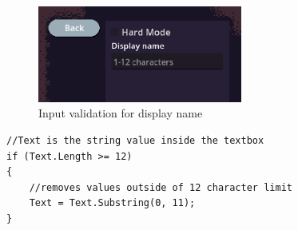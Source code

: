 \documentclass{article}
\begin{document}
\begin{figure}[H]
\centering 
\includegraphics[width=0.6\textwidth]{input validation}
\caption{Input validation for display name}
\label{input_validation}
\end{figure}

\begin{lstlisting}
//Text is the string value inside the textbox
if (Text.Length >= 12)
{
	//removes values outside of 12 character limit
	Text = Text.Substring(0, 11);
}
\end{lstlisting}
\end{document}
